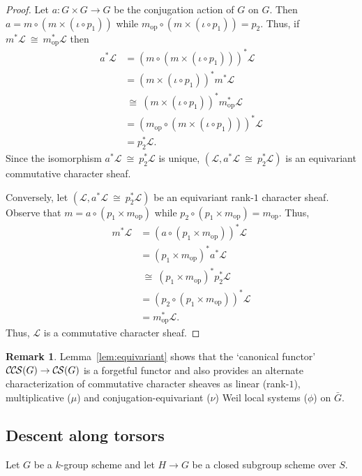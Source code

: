 \documentclass[10pt]{amsart}
\theoremstyle{plain}
\theoremstyle{definition}
\newtheorem{remark}[theorem]{Remark}
\newcommand{\op}{_{\operatorname{op}}}
\newcommand{\iso}{{\ \cong\ }}
\newcommand{\cs}[1]{{\mathcal{#1}}}
\newcommand{\CS}{{\mathcal{C\hskip-0.8pt S}}}
\newcommand{\CCS}{{\mathcal{C\hskip-.8pt C\hskip-0.8pt S}}}
\newcommand{\bG}{\bar{G}}
\begin{document}
\begin{proof}
Let $a : G \times G \to G$ be the conjugation action of $G$ on $G$. Then $a = m \circ (m \times (\iota \circ p_1))$ while $m\op \circ (m \times (\iota \circ p_1)) = p_2$. Thus, if $m^*\cs{L} \iso m\op^*\cs{L}$ then
\begin{align*}
a^* \cs{L} 
&= (m \circ (m \times (\iota \circ p_1)))^* \cs{L}\\
&= (m \times (\iota \circ p_1))^* m^* \cs{L}\\
&\iso (m \times (\iota \circ p_1))^* m\op^* \cs{L}\\
&= (m\op \circ (m \times (\iota \circ p_1)))^* \cs{L}\\
&= p_2^*\cs{L}.
\end{align*}
Since the isomorphism $a^*\cs{L} \iso p_2^*\cs{L}$ is unique, $(\cs{L}, a^*\cs{L} \iso p_2^*\cs{L})$ is an equivariant commutative character sheaf.

Conversely, let $(\cs{L}, a^*\cs{L} \iso p_2^*\cs{L})$ be an equivariant rank-$1$ character sheaf.
Observe that $m = a \circ (p_1\times m\op)$ while $p_2 \circ (p_1\times m\op) = m\op$. Thus, 
\begin{align*}
m^* \cs{L} 
&= (a \circ (p_1 \times m\op))^* \cs{L}\\
&= (p_1 \times m\op)^* a^* \cs{L}\\
&\iso (p_1 \times m\op)^* p_2^* \cs{L}\\
&= (p_2\circ (p_1 \times m\op))^* \cs{L}\\
&= m\op^* \cs{L}.
\end{align*}
Thus, $\cs{L}$ is a commutative character sheaf.
\end{proof}



\begin{remark}
Lemma~\ref{lem:equivariant} shows that the `canonical functor' $\CCS(G) \to \CS(G)$ is a forgetful functor and also provides an alternate characterization of commutative character sheaves as linear (rank-$1$), multiplicative ($\mu$) and conjugation-equivariant ($\nu$) Weil local systems ($\phi$) on $\bG$.
\end{remark}


\subsection{Descent along torsors}

Let $G$ be a $k$-group scheme and let $H \to G$ be a closed subgroup scheme over $S$.
\end{document}
